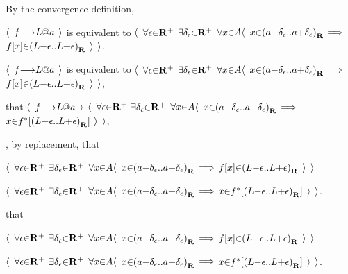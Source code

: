 \hs \par
\hs By the convergence definition, \par
\hs $\a\langle$ $f \to L \p@ a$ $\a\rangle$ is equivalent to $\a\langle$ $\a\forall \epsilon \p\in \R^+$ $\a\exists \delta_\epsilon \p\in \R^+$ $\a\forall x \p\in A \a\langle$ $x \p\in \a(a\p-\delta_\epsilon \a{..} a\p+\delta_\epsilon\a)_\R$ $\a\lthen$ $f[x] \p\in \a(L\p-\epsilon \a{..} L\p+\epsilon\a)_\R$ $\a\rangle$ $\a\rangle$. \par
\hs {} $\a\langle$ $f \to L \p@ a$ $\a\rangle$ is equivalent to $\a\langle$ $\a\forall \epsilon \p\in \R^+$ $\a\exists \delta_\epsilon \p\in \R^+$ $\a\forall x \p\in A \a\langle$ $x \p\in \a(a\p-\delta_\epsilon \a{..} a\p+\delta_\epsilon\a)_\R$ $\a\lthen$ $f[x] \p\in \a(L\p-\epsilon \a{..} L\p+\epsilon\a)_\R$ $\a\rangle$ $\a\rangle$, \par
\hs {}  that $\a\langle$ $f \to L \p@ a$ $\a\rangle$  $\a\langle$ $\a\forall \epsilon \p\in \R^+$ $\a\exists \delta_\epsilon \p\in \R^+$ $\a\forall x \p\in A \a\langle$ $x \p\in \a(a\p-\delta_\epsilon \a{..} a\p+\delta_\epsilon\a)_\R$ $\a\lthen$ $x \p\in f^*[\a(L\p-\epsilon \a{..} L\p+\epsilon\a)_\R]$ $\a\rangle$ $\a\rangle$, \par
\hs {}, by replacement,  that \par
\hs $\a\langle$ $\a\forall \epsilon \p\in \R^+$ $\a\exists \delta_\epsilon \p\in \R^+$ $\a\forall x \p\in A \a\langle$ $x \p\in \a(a\p-\delta_\epsilon \a{..} a\p+\delta_\epsilon\a)_\R$ $\a\lthen$ $f[x] \p\in \a(L\p-\epsilon \a{..} L\p+\epsilon\a)_\R$ $\a\rangle$ $\a\rangle$ \par
\hs {} \par
\hs $\a\langle$ $\a\forall \epsilon \p\in \R^+$ $\a\exists \delta_\epsilon \p\in \R^+$ $\a\forall x \p\in A \a\langle$ $x \p\in \a(a\p-\delta_\epsilon \a{..} a\p+\delta_\epsilon\a)_\R$ $\a\lthen$ $x \p\in f^*[\a(L\p-\epsilon \a{..} L\p+\epsilon\a)_\R]$ $\a\rangle$ $\a\rangle$. \par
\hs {} that \par
\hs $\a\langle$ $\a\forall \epsilon \p\in \R^+$ $\a\exists \delta_\epsilon \p\in \R^+$ $\a\forall x \p\in A \a\langle$ $x \p\in \a(a\p-\delta_\epsilon \a{..} a\p+\delta_\epsilon\a)_\R$ $\a\lthen$ $f[x] \p\in \a(L\p-\epsilon \a{..} L\p+\epsilon\a)_\R$ $\a\rangle$ $\a\rangle$ \par
\hs {} \par
\hs $\a\langle$ $\a\forall \epsilon \p\in \R^+$ $\a\exists \delta_\epsilon \p\in \R^+$ $\a\forall x \p\in A \a\langle$ $x \p\in \a(a\p-\delta_\epsilon \a{..} a\p+\delta_\epsilon\a)_\R$ $\a\lthen$ $x \p\in f^*[\a(L\p-\epsilon \a{..} L\p+\epsilon\a)_\R]$ $\a\rangle$ $\a\rangle$. \par

